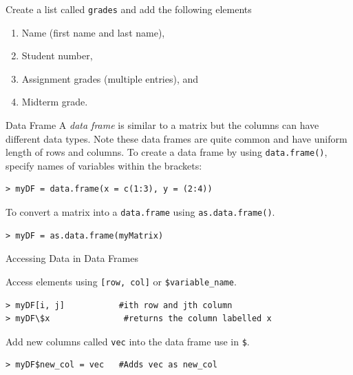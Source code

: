 \documentclass[xcolor=svgnames, 10pt, handout]{beamer}
\begin{document}
\begin{frame}[fragile]
\begin{question}
Create a list called \texttt{grades} and add the following elements
\begin{enumerate}
\item Name (first name and last name),
\item Student number,
\item Assignment grades (multiple entries), and
\item Midterm grade.
\end{enumerate}
\end{question}
\end{frame}


\begin{frame}[fragile]{Data Frame}
\vfill
A \emph{data frame} is similar to a matrix but the columns can have different data types.  Note these data frames are quite common and have uniform length of rows and columns.
\vfill
To create a data frame by using \texttt{data.frame()}, specify names of variables within the brackets:
\begin{Verbatim}[commandchars=\\\{\}, xleftmargin=2em]
> myDF = data.frame(x = c(1:3), y = (2:4))
\end{Verbatim}
\vfill
To convert a matrix into a \texttt{data.frame} using \texttt{as.data.frame()}.
\begin{Verbatim}[commandchars=\\\{\}, xleftmargin=2em]
> myDF = as.data.frame(myMatrix)
\end{Verbatim}
\vfill
\end{frame}


\begin{frame}[fragile]{Accessing Data in Data Frames}

Access elements using \texttt{[row, col]} or \verb|$variable_name|.
\begin{Verbatim}[commandchars=\\\{\}, xleftmargin=2em]
> myDF[i, j]           #ith row and jth column
> myDF\$x               #returns the column labelled x
\end{Verbatim}

Add new columns called \texttt{vec} into the data frame use in \verb|$|.
\begin{Verbatim}[commandchars=\\\{\}, xleftmargin=2em]
> myDF$new_col = vec   #Adds vec as new_col
\end{Verbatim}

\end{frame}
\end{document}

